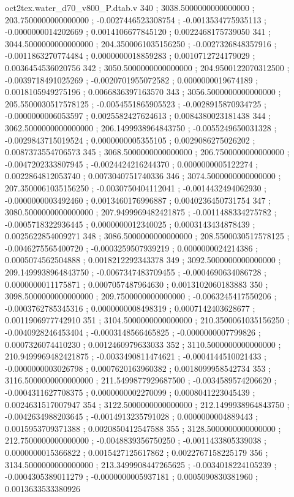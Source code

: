 \begin{filecontents}[overwrite]{oct2tex.water_d70_v800_P.dtab.v}
340 ; 3038.5000000000000000 ; 203.7500000000000000 ; -0.0027446523308754 ; -0.0013534775935113 ; -0.0000000014202669 ; 0.0014106677845120 ; 0.0022468175739050
341 ; 3044.5000000000000000 ; 204.3500061035156250 ; -0.0027326848357916 ; -0.0011863270774484 ; 0.0000000018859283 ; 0.0010712724179029 ; 0.0036454536020756
342 ; 3050.5000000000000000 ; 204.9500122070312500 ; -0.0039718491025269 ; -0.0020701955072582 ; 0.0000000019674189 ; 0.0018105949275196 ; 0.0066836397163570
343 ; 3056.5000000000000000 ; 205.5500030517578125 ; -0.0054551865905523 ; -0.0028915870934725 ; -0.0000000006053597 ; 0.0025582427624613 ; 0.0084380023181438
344 ; 3062.5000000000000000 ; 206.1499938964843750 ; -0.0055249650031328 ; -0.0029843715019524 ; 0.0000000005355105 ; 0.0029086275026202 ; 0.0087373554706573
345 ; 3068.5000000000000000 ; 206.7500000000000000 ; -0.0047202333807945 ; -0.0024424216244370 ; 0.0000000005122274 ; 0.0022864812053740 ; 0.0073040751740336
346 ; 3074.5000000000000000 ; 207.3500061035156250 ; -0.0030750404112041 ; -0.0014432494062930 ; -0.0000000003492460 ; 0.0013460176996887 ; 0.0040236450731754
347 ; 3080.5000000000000000 ; 207.9499969482421875 ; -0.0011488334275782 ; -0.0005718322936445 ; 0.0000000012340025 ; 0.0003143434878439 ; 0.0025622854009271
348 ; 3086.5000000000000000 ; 208.5500030517578125 ; -0.0046275565400720 ; -0.0003259507939219 ; 0.0000000024214386 ; 0.0005074562504888 ; 0.0018212292343378
349 ; 3092.5000000000000000 ; 209.1499938964843750 ; -0.0067347483709455 ; -0.0004690634086728 ; 0.0000000011175871 ; 0.0007057487964630 ; 0.0013102060183883
350 ; 3098.5000000000000000 ; 209.7500000000000000 ; -0.0063245417550206 ; -0.0003762785345316 ; 0.0000000008498319 ; 0.0007142403628677 ; 0.0011906977742910
351 ; 3104.5000000000000000 ; 210.3500061035156250 ; -0.0040928246453404 ; -0.0003148566465825 ; -0.0000000007799826 ; 0.0007326074410230 ; 0.0012460979633033
352 ; 3110.5000000000000000 ; 210.9499969482421875 ; -0.0033490811474621 ; -0.0004144510021433 ; -0.0000000003026798 ; 0.0007620163960382 ; 0.0018099958542734
353 ; 3116.5000000000000000 ; 211.5499877929687500 ; -0.0034589574206620 ; -0.0004311627708375 ; 0.0000000002270099 ; 0.0008041223045439 ; 0.0024631517007947
354 ; 3122.5000000000000000 ; 212.1499938964843750 ; -0.0042634988203645 ; -0.0014913235791028 ; 0.0000000004889443 ; 0.0015953709371388 ; 0.0020850412547588
355 ; 3128.5000000000000000 ; 212.7500000000000000 ; -0.0048839356750250 ; -0.0011433805339038 ; 0.0000000015366822 ; 0.0015427125617862 ; 0.0022767158225179
356 ; 3134.5000000000000000 ; 213.3499908447265625 ; -0.0034018224105239 ; -0.0004305389011279 ; -0.0000000005937181 ; 0.0005090830381960 ; 0.0013633533380926

\end{filecontents}
